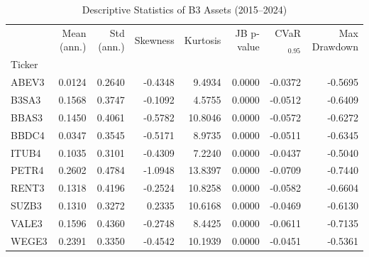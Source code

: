 \begin{table}
\caption{Descriptive Statistics of B3 Assets (2015--2024)}
\label{tab:descriptive_stats}
\begin{tabular}{lrrrrrrr}
\toprule
 & Mean (ann.) & Std (ann.) & Skewness & Kurtosis & JB p-value & CVaR$_{0.95}$ & Max Drawdown \\
Ticker &  &  &  &  &  &  &  \\
\midrule
ABEV3 & 0.0124 & 0.2640 & -0.4348 & 9.4934 & 0.0000 & -0.0372 & -0.5695 \\
B3SA3 & 0.1568 & 0.3747 & -0.1092 & 4.5755 & 0.0000 & -0.0512 & -0.6409 \\
BBAS3 & 0.1450 & 0.4061 & -0.5782 & 10.8046 & 0.0000 & -0.0572 & -0.6272 \\
BBDC4 & 0.0347 & 0.3545 & -0.5171 & 8.9735 & 0.0000 & -0.0511 & -0.6345 \\
ITUB4 & 0.1035 & 0.3101 & -0.4309 & 7.2240 & 0.0000 & -0.0437 & -0.5040 \\
PETR4 & 0.2602 & 0.4784 & -1.0948 & 13.8397 & 0.0000 & -0.0709 & -0.7440 \\
RENT3 & 0.1318 & 0.4196 & -0.2524 & 10.8258 & 0.0000 & -0.0582 & -0.6604 \\
SUZB3 & 0.1310 & 0.3272 & 0.2335 & 10.6168 & 0.0000 & -0.0469 & -0.6130 \\
VALE3 & 0.1596 & 0.4360 & -0.2748 & 8.4425 & 0.0000 & -0.0611 & -0.7135 \\
WEGE3 & 0.2391 & 0.3350 & -0.4542 & 10.1939 & 0.0000 & -0.0451 & -0.5361 \\
\bottomrule
\end{tabular}
\end{table}
